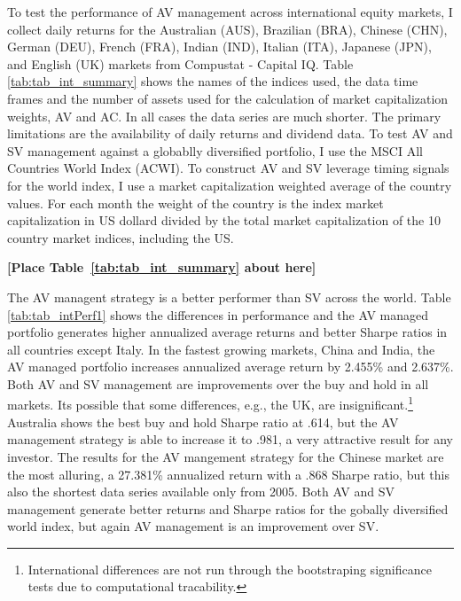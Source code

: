
To test the performance of AV management across international equity markets, I collect daily returns for the Australian (AUS), Brazilian (BRA), Chinese (CHN), German (DEU), French (FRA), Indian (IND), Italian (ITA), Japanese (JPN), and English (UK) markets from Compustat - Capital IQ. Table \ref{tab:tab_int_summary} shows the names of the indices used, the data time frames and the number of assets used for the calculation of market capitalization weights, AV and AC. In all cases the data series are much shorter. The primary limitations are the availability of daily returns and dividend data. To test AV and SV management against a globablly diversified portfolio, I use the MSCI All Countries World Index (ACWI). To construct AV and SV leverage timing signals for the world index, I use a market capitalization weighted average of the country values. For each month the weight of the country is the index market capitalization in US dollard divided by the total market capitalization of the 10 country market indices, including the US.

\bigskip
\centerline{\bf [Place Table~\ref{tab:tab_int_summary} about here]}
\bigskip

The AV managent strategy is a better performer than SV across the world. Table \ref{tab:tab_intPerf1} shows the differences in performance and the AV managed portfolio generates higher annualized average returns and better Sharpe ratios in all countries except Italy. In the fastest growing markets, China and India, the AV managed portfolio increases annualized average return by 2.455\% and 2.637\%. Both AV and SV management are improvements over the buy and hold in all markets. Its possible that some differences, e.g., the UK, are insignificant.\footnote{International differences are not run through the bootstraping significance tests due to computational tracability.} 
Australia shows the best buy and hold Sharpe ratio at .614, but the AV management strategy is able to increase it to .981, a very attractive result for any investor. The results for the AV mangement strategy for the Chinese market are the most alluring, a 27.381\% annualized return with a .868 Sharpe ratio, but this also the shortest data series available only from 2005. Both AV and SV management generate better returns and Sharpe ratios for the gobally diversified world index, but again AV management is an improvement over SV.

